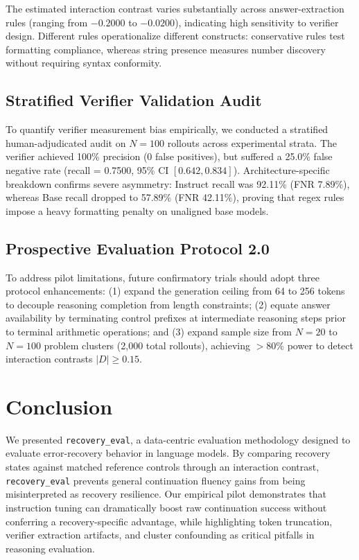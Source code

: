 \documentclass[conference]{IEEEtran}
\begin{document}
The estimated interaction contrast varies substantially across answer-extraction rules (ranging from $-0.2000$ to $-0.0200$), indicating high sensitivity to verifier design. Different rules operationalize different constructs: conservative rules test formatting compliance, whereas string presence measures number discovery without requiring syntax conformity.

\subsection{Stratified Verifier Validation Audit}
To quantify verifier measurement bias empirically, we conducted a stratified human-adjudicated audit on $N=100$ rollouts across experimental strata. The verifier achieved 100\% precision (0 false positives), but suffered a 25.0\% false negative rate (recall = 0.7500, 95\% CI $[0.642, 0.834]$). Architecture-specific breakdown confirms severe asymmetry: Instruct recall was 92.11\% (FNR 7.89\%), whereas Base recall dropped to 57.89\% (FNR 42.11\%), proving that regex rules impose a heavy formatting penalty on unaligned base models.

\subsection{Prospective Evaluation Protocol 2.0}
To address pilot limitations, future confirmatory trials should adopt three protocol enhancements: (1) expand the generation ceiling from 64 to 256 tokens to decouple reasoning completion from length constraints; (2) equate answer availability by terminating control prefixes at intermediate reasoning steps prior to terminal arithmetic operations; and (3) expand sample size from $N=20$ to $N=100$ problem clusters (2,000 total rollouts), achieving $>80\%$ power to detect interaction contrasts $|D| \ge 0.15$.

\section{Conclusion}
We presented \texttt{recovery\_eval}, a data-centric evaluation methodology designed to evaluate error-recovery behavior in language models. By comparing recovery states against matched reference controls through an interaction contrast, \texttt{recovery\_eval} prevents general continuation fluency gains from being misinterpreted as recovery resilience. Our empirical pilot demonstrates that instruction tuning can dramatically boost raw continuation success without conferring a recovery-specific advantage, while highlighting token truncation, verifier extraction artifacts, and cluster confounding as critical pitfalls in reasoning evaluation.

\vspace{-1.5mm}


\end{document}
